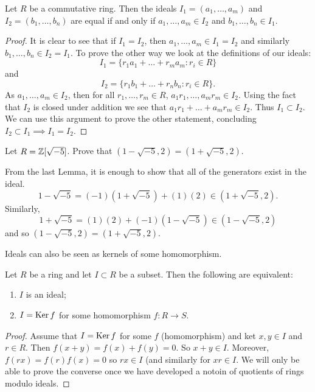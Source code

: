 \begin{lemma}[]
    Let $R$ be a commutative ring. Then the ideals $I_1 = (a_1, \ldots, a_m)$ and $I_2 = (b_1, \ldots, b_n)$ are equal if and only if $a_1,\ldots, a_m \in I_2$ and $b_1, \ldots, b_n \in I_1$.
\end{lemma}

\begin{proof}
    It is clear to see that if $I_1 = I_2$, then $a_1, \ldots, a_m \in I_1 = I_2$ and similarly $b_1, \ldots, b_n \in I_2 = I_1$. To prove the other way we look at the definitions of our ideals:
    \[ I_1 = \{ r_1a_1 + \ldots + r_m a_m : r_i \in R \} \]
    and
    \[ I_2 = \{ r_1b_1 + \ldots + r_n b_n : r_i \in R \}. \]
    As $a_1, \ldots, a_m \in I_2$, then for all $r_1, \ldots, r_m \in R$, $a_1r_1, \ldots, a_mr_m \in I_2$. Using the fact that $I_2$ is closed under addition we see that $a_1r_1 + \ldots + a_m r_m \in I_2$. Thus $I_1 \subset I_2$. We can use this argument to prove the other statement, concluding $I_2 \subset I_1 \implies I_1 = I_2$.
\end{proof}

\begin{example}
    Let $R = \mathbb{Z}[\sqrt{-5}]$. Prove that $(1 - \sqrt{-5}, 2) = (1 + \sqrt{-5}, 2)$.
\end{example}

\begin{solution}
    From the last Lemma, it is enough to show that all of the generators exist in the ideal.
    \[ 1 - \sqrt{-5} = (-1)(1 + \sqrt{-5}) + (1)(2) \in (1 + \sqrt{-5}, 2). \]
    Similarly,
    \[ 1 + \sqrt{-5} = (1)(2) + (-1)(1 - \sqrt{-5}) \in (1 - \sqrt{-5}, 2) \]
    and so $(1 - \sqrt{-5}, 2) = (1 + \sqrt{-5}, 2)$.
\end{solution}

Ideals can also be seen as kernels of some homomorphism.

\begin{lemma}
    Let $R$ be a ring and let $I \subset R$ be a subset. Then the following are equivalent:
    \begin{enumerate}
        \item $I$ is an ideal;
        \item $I = \operatorname{Ker}{f}$ for some homomorphism $f: R \to S$.
    \end{enumerate}
\end{lemma}

\begin{proof}
    Assume that $I = \operatorname{Ker}{f}$ for some $f$ (homomorphism) and ket $x, y \in I$ and $r \in R$. Then $f(x + y) = f(x) + f(y) = 0$. So $x + y \in I$. Moreover, $f(rx) = f(r) f(x) = 0$ so $rx \in I$ (and similarly for $xr \in I$. We will only be able to prove the converse once we have developed a notoin of quotients of rings modulo ideals.
\end{proof}

